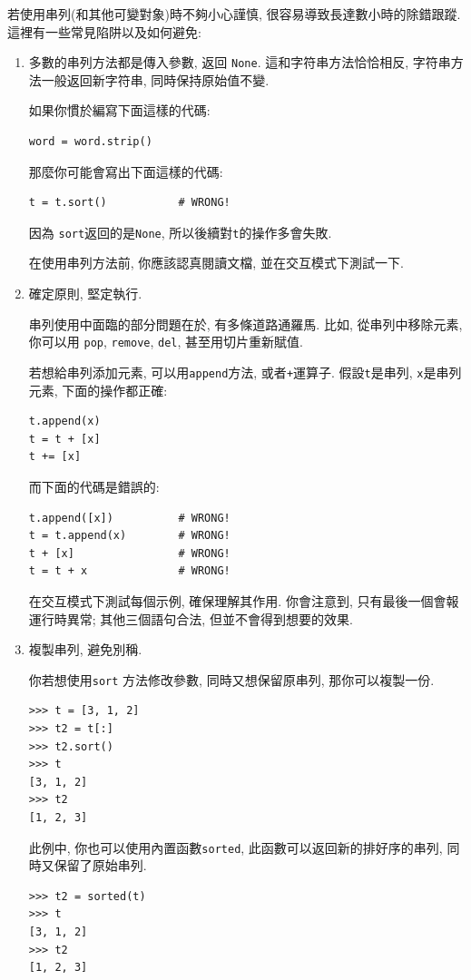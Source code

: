 \documentclass[10pt]{book}
\begin{document}
若使用串列(和其他可變對象)時不夠小心謹慎, 很容易導致長達數小時的除錯跟蹤. 
這裡有一些常見陷阱以及如何避免:

\begin{enumerate}

\item 多數的串列方法都是傳入參數, 返回 {\tt None}. 
這和字符串方法恰恰相反, 字符串方法一般返回新字符串, 
同時保持原始值不變. 

如果你慣於編寫下面這樣的代碼:

\begin{verbatim}
word = word.strip()
\end{verbatim}

那麼你可能會寫出下面這樣的代碼:

\begin{verbatim}
t = t.sort()           # WRONG!
\end{verbatim}

因為 {\tt sort}返回的是{\tt None}, 所以後續對{\tt t}的操作多會失敗.

在使用串列方法前, 你應該認真閱讀文檔, 並在交互模式下測試一下. 

\item 確定原則, 堅定執行.

串列使用中面臨的部分問題在於, 有多條道路通羅馬. 
比如, 從串列中移除元素, 你可以用 {\tt pop}, {\tt remove}, {\tt del},
甚至用切片重新賦值. 

若想給串列添加元素, 可以用{\tt append}方法, 或者{\tt +}運算子. 
假設{\tt t}是串列, {\tt x}是串列元素, 下面的操作都正確: 

\begin{verbatim}
t.append(x)
t = t + [x]
t += [x]
\end{verbatim}

而下面的代碼是錯誤的:

\begin{verbatim}
t.append([x])          # WRONG!
t = t.append(x)        # WRONG!
t + [x]                # WRONG!
t = t + x              # WRONG!
\end{verbatim}

在交互模式下測試每個示例, 確保理解其作用. 
你會注意到, 只有最後一個會報運行時異常;
其他三個語句合法, 但並不會得到想要的效果. 


\item 複製串列, 避免別稱.

你若想使用{\tt sort} 方法修改參數, 同時又想保留原串列, 那你可以複製一份. 

\begin{verbatim}
>>> t = [3, 1, 2]
>>> t2 = t[:]
>>> t2.sort()
>>> t
[3, 1, 2]
>>> t2
[1, 2, 3]
\end{verbatim}

此例中, 你也可以使用內置函數{\tt sorted}, 
此函數可以返回新的排好序的串列, 同時又保留了原始串列. 

\begin{verbatim}
>>> t2 = sorted(t)
>>> t
[3, 1, 2]
>>> t2
[1, 2, 3]
\end{verbatim}

\end{enumerate}
\end{document}
